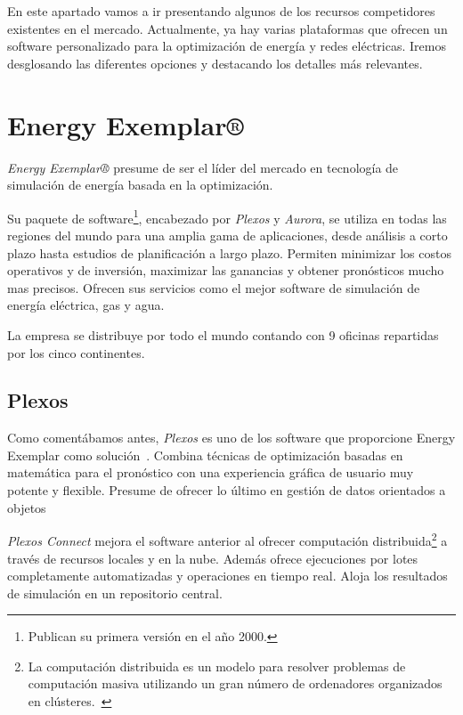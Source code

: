 
En este apartado vamos a ir presentando algunos de los recursos competidores existentes en el mercado. Actualmente, ya hay varias plataformas que ofrecen un software personalizado para la optimización de energía y redes eléctricas. Iremos desglosando las diferentes opciones y destacando los detalles más relevantes.

\section{Energy Exemplar®}

\textit{Energy Exemplar®} presume de ser el líder del mercado en tecnología de simulación de energía basada en la optimización. 

Su paquete de software\footnote{Publican su primera versión en el año 2000.}, encabezado por \textit{Plexos} y \textit{Aurora}, se utiliza en todas las regiones del mundo para una amplia gama de aplicaciones, desde análisis a corto plazo hasta estudios de planificación a largo plazo. Permiten minimizar los costos operativos y de inversión, maximizar las ganancias y obtener pronósticos mucho mas precisos. Ofrecen sus servicios como el mejor software de simulación de energía eléctrica, gas y agua.  

La empresa se distribuye por todo el mundo contando con 9 oficinas repartidas por los cinco continentes.

\subsection{Plexos}

Como comentábamos antes, \textit{Plexos} es uno de los software que proporcione Energy Exemplar como solución~\cite{web:EnergyExemplarPlexos}. Combina técnicas de optimización basadas en matemática para el pronóstico con una experiencia gráfica de usuario muy potente y flexible. Presume de ofrecer lo último en gestión de datos orientados a objetos

\textit{Plexos Connect} mejora el software anterior al ofrecer computación distribuida\footnote{La computación distribuida es un modelo para resolver problemas de computación masiva utilizando un gran número de ordenadores organizados en clústeres.~\cite{web:computacionDistribuida}} a través de recursos locales y en la nube. Además ofrece ejecuciones por lotes completamente automatizadas y operaciones en tiempo real. Aloja los resultados de simulación en un repositorio central.

